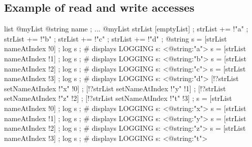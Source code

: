 \subsection{Example of read and write accesses}

\begin{galgas}
list @myList {
  @string name ;
}
...
@myList strList [emptyList] ;
strList += !"a" ;
strList += !"b" ;
strList += !"c" ;
strList += !"d" ;
@string s = [strList nameAtIndex !0] ;
log s ; # displays LOGGING s: <@string:"a">
s = [strList nameAtIndex !1] ;
log s ; # displays LOGGING s: <@string:"b">
s = [strList nameAtIndex !2] ;
log s ; # displays LOGGING s: <@string:"c">
s = [strList nameAtIndex !3] ;
log s ; # displays LOGGING s: <@string:"d">
[!?strList setNameAtIndex !"x" !0] ;
[!?strList setNameAtIndex !"y" !1] ;
[!?strList setNameAtIndex !"z" !2] ;
[!?strList setNameAtIndex !"t" !3] ;
s = [strList nameAtIndex !0] ;
log s ; # displays LOGGING s: <@string:"x">
s = [strList nameAtIndex !1] ;
log s ; # displays LOGGING s: <@string:"y">
s = [strList nameAtIndex !2] ;
log s ; # displays LOGGING s: <@string:"z">
s = [strList nameAtIndex !3] ;
log s ; # displays LOGGING s: <@string:"t">
\end{galgas}
